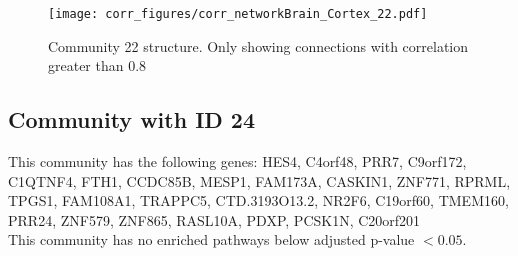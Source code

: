 \begin{figure}[h!]
\centering
\texttt{[image: corr\_figures/corr\_networkBrain\_Cortex\_22.pdf]}
\caption{Community 22 structure. Only showing connections with correlation greater than 0.8}
\end{figure}




\subsection*{Community with ID 24}
This community has the following genes: HES4, C4orf48, PRR7, C9orf172, C1QTNF4, FTH1, CCDC85B, MESP1, FAM173A, CASKIN1, ZNF771, RPRML, TPGS1, FAM108A1, TRAPPC5, CTD.3193O13.2, NR2F6, C19orf60, TMEM160, PRR24, ZNF579, ZNF865, RASL10A, PDXP, PCSK1N, C20orf201
\\
This community has no enriched pathways below adjusted p-value $< 0.05$.

